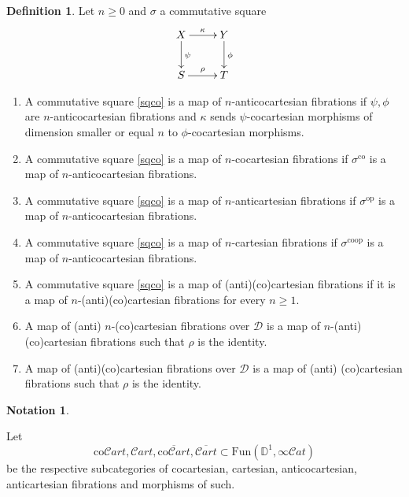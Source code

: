 \documentclass[10pt,oneside]{article}
\numberwithin{equation}{section} %
\numberwithin{figure}{section} %
\theoremstyle{plain}
\theoremstyle{definition}
\newtheorem{definition}[theorem]{Definition}
\newtheorem{notation}[theorem]{Notation}
\newcommand{\bD}{{\mathbb D}}
\newcommand{\mD}{{\mathcal D}}
\newcommand{\op}{\mathrm{op}}
\newcommand{\co}{\mathrm{co}}
\newcommand{\Fun}{\mathrm{Fun}}
\newcommand{\coop}{\mathrm{coop}}
\newcommand{\scat}{\mathcal{C}\mathit{at}}
\begin{document}
\begin{definition}Let $n \geq 0$ and $\sigma$ a commutative square
\begin{equation}\label{sqco}
\begin{xy}
\xymatrix{
X \ar[d]^\psi \ar[r]^\kappa
& Y \ar[d]^\phi
\\ 
S \ar[r]^\rho & T
}
\end{xy}\end{equation}

\begin{enumerate}[\normalfont(1)]\setlength{\itemsep}{-2pt}

\item A commutative square \ref{sqco} is a map of $n$-anticocartesian fibrations if $\psi, \phi$ are $n$-anticocartesian fibrations and $\kappa$ sends $\psi$-cocartesian morphisms of dimension smaller or equal $n$ to $\phi$-cocartesian morphisms.

\item A commutative square \ref{sqco}
is a map of $n$-cocartesian fibrations if $\sigma^\co$ is a map of $n$-anticocartesian fibrations.

\item A commutative square \ref{sqco}
is a map of $n$-anticartesian fibrations if $\sigma^\op$ is a map of $n$-anticocartesian fibrations.

\item A commutative square \ref{sqco}
is a map of $n$-cartesian fibrations if $\sigma^\coop$ is a map of $n$-anticocartesian fibrations.

\item A commutative square \ref{sqco}
is a map of (anti)(co)cartesian fibrations if it is a map of
$n$-(anti)(co)cartesian fibrations for every $n \geq 1.$

\item A map of (anti) $n$-(co)cartesian fibrations over $\mD$ is a map of $n$-(anti)(co)cartesian fibrations such that $\rho$ is the identity.

\item A map of (anti)(co)cartesian fibrations over $\mD$ is a map of (anti) (co)cartesian fibrations such that $\rho$ is the identity.
\end{enumerate}

\end{definition}

\begin{notation}\label{notfib1}

Let $$\co\mathcal{C}\mathit{art}, \mathcal{C}\mathit{art}, \overline{\co\mathcal{C}\mathit{art}}, \overline{\mathcal{C}\mathit{art}} \subset \Fun(\bD^1,\infty\scat)$$
be the respective subcategories of cocartesian, cartesian, anticocartesian, anticartesian fibrations and morphisms of such. 

\end{notation}
\end{document}

